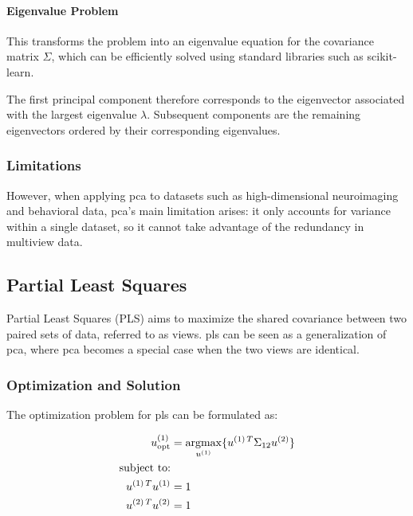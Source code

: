 \paragraph{Eigenvalue Problem}

This transforms the problem into an eigenvalue equation for the covariance matrix \(\Sigma\), which can be efficiently solved using standard libraries such as scikit-learn\citep{pedregosa2011scikit}.

The first principal component therefore corresponds to the eigenvector associated with the largest eigenvalue \(\lambda\). Subsequent components are the remaining eigenvectors ordered by their corresponding eigenvalues.

\subsubsection{Limitations}
However, when applying \acrshort{pca} to datasets such as high-dimensional neuroimaging and behavioral
data, \acrshort{pca}'s main limitation arises: it only accounts for variance within a single dataset, so it cannot take advantage of the redundancy in multiview data.

\subsection{Partial Least Squares}

Partial Least Squares (PLS)\citep{wold1975path} aims to maximize the shared covariance between two paired sets of data, referred to as \gls{views}. \acrshort{pls} can be seen as a generalization of \acrshort{pca}, where \acrshort{pca} becomes a special case when the two \gls{views} are identical.

\subsubsection{Optimization and Solution}

The optimization problem for \acrshort{pls} can be formulated as:

\begin{align}
    u^{(1)}_{\text{opt}} & = \underset{u^{(1)}}{\mathrm{argmax}} \{ u^{(1)\,T} \Sigma_{12} u^{(2)} \} \\
    \text{subject to:} \notag                                                                             \\
    u^{(1)\,T}u^{(1)}   & = 1 \notag                                                                    \\
    u^{(2)\,T}u^{(2)}   & = 1 \notag
\end{align}

